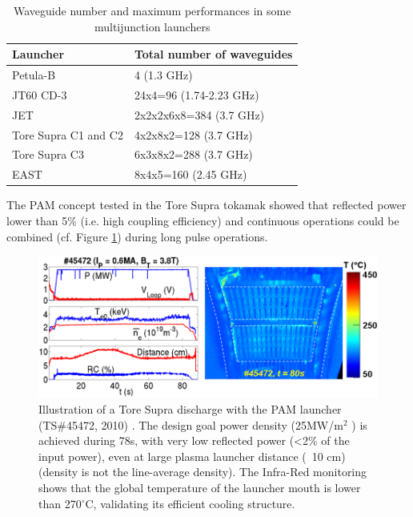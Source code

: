 \begin{table}
{
\begin{tabular}{| p{6cm} | p{5cm} |}
	\hline 
Launcher	& Total number of waveguides  \\ 
	\hline \hline
Petula-B \parencite{Gormezano1985}	& 4 (1.3 GHz)    \\ 
	\hline 
JT60 CD-3 \parencite{Ikeda1989}	& 24x4=96 (1.74-2.23 GHz)    \\ 
	\hline 
JET \parencite{Litaudon1990a}	& 2x2x2x6x8=384 (3.7 GHz)   \\ 
	\hline 
Tore Supra C1 and C2 \parencite{Litaudon1992a}	& 4x2x8x2=128 (3.7 GHz)   \\ 
	\hline 
Tore Supra C3 \parencite{Bibet2000}	& 6x3x8x2=288 (3.7 GHz)   \\ 
	\hline 
EAST & 8x4x5=160 (2.45 GHz) \\
\hline
\end{tabular} 
}
\caption{Waveguide number and maximum performances in some multijunction launchers}
\label{tab:multijunctionperformances}
\end{table}


The PAM concept tested in the Tore Supra tokamak showed that reflected power lower than 5\% (i.e. high coupling efficiency) and continuous operations could be combined (cf. Figure \ref{fig:ts45472c4ir}) during long pulse operations. 
\begin{figure}
\centering
\includegraphics[width=0.9\linewidth]{Figures/LHCD/TS45472_C4_IR}
\caption{Illustration of a Tore Supra discharge with the PAM launcher (TS\#45472, 2010) \parencite{Ekedahl2010b}. The design goal power density (25MW/m$^2$ ) is achieved during 78s, with very low reflected power (<2\% of the input power), even at large plasma launcher distance (~10 cm) (density is not the line-average density). The Infra-Red monitoring shows that the global temperature of the launcher mouth is lower than 270$^{\circ}$C, validating its efficient cooling structure.}
\label{fig:ts45472c4ir}
\end{figure}


